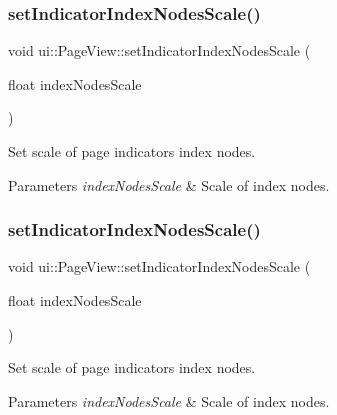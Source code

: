 \subsubsection{\texorpdfstring{set\+Indicator\+Index\+Nodes\+Scale()}{setIndicatorIndexNodesScale()}\hspace{0.1cm}{\footnotesize\ttfamily [1/2]}}
{\footnotesize\ttfamily void ui\+::\+Page\+View\+::set\+Indicator\+Index\+Nodes\+Scale (\begin{DoxyParamCaption}\item[{float}]{index\+Nodes\+Scale }\end{DoxyParamCaption})}



Set scale of page indicator\textquotesingle{}s index nodes. 


\begin{DoxyParams}{Parameters}
{\em index\+Nodes\+Scale} & Scale of index nodes. \\
\hline
\end{DoxyParams}
\mbox{\label{classui_1_1PageView_a8660efb9530d9f8783b439e4ba0e2e63}} 
\subsubsection{\texorpdfstring{set\+Indicator\+Index\+Nodes\+Scale()}{setIndicatorIndexNodesScale()}\hspace{0.1cm}{\footnotesize\ttfamily [2/2]}}
{\footnotesize\ttfamily void ui\+::\+Page\+View\+::set\+Indicator\+Index\+Nodes\+Scale (\begin{DoxyParamCaption}\item[{float}]{index\+Nodes\+Scale }\end{DoxyParamCaption})}



Set scale of page indicator\textquotesingle{}s index nodes. 


\begin{DoxyParams}{Parameters}
{\em index\+Nodes\+Scale} & Scale of index nodes. \\
\hline
\end{DoxyParams}
\mbox{\label{classui_1_1PageView_a1413a09228d8aa99d44afbd77b9354e4}} 
